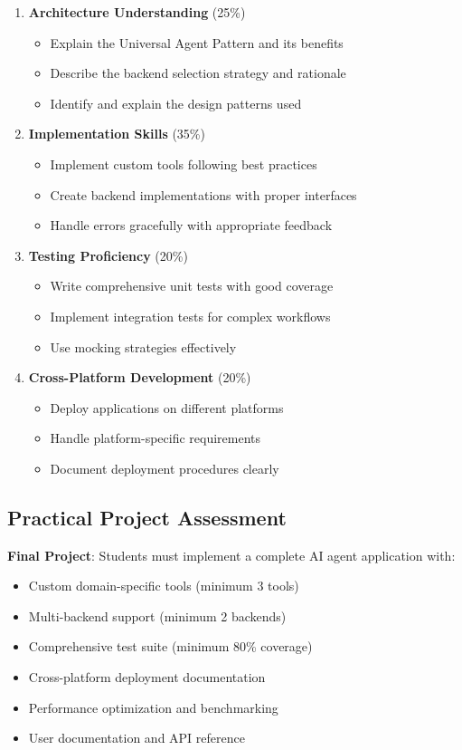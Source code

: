 \documentclass{article}
\begin{document}
\begin{enumerate}[label=\Alph*.]
    \item \textbf{Architecture Understanding} (25\%)
    \begin{itemize}
        \item Explain the Universal Agent Pattern and its benefits
        \item Describe the backend selection strategy and rationale
        \item Identify and explain the design patterns used
    \end{itemize}

    \item \textbf{Implementation Skills} (35\%)
    \begin{itemize}
        \item Implement custom tools following best practices
        \item Create backend implementations with proper interfaces
        \item Handle errors gracefully with appropriate feedback
    \end{itemize}

    \item \textbf{Testing Proficiency} (20\%)
    \begin{itemize}
        \item Write comprehensive unit tests with good coverage
        \item Implement integration tests for complex workflows
        \item Use mocking strategies effectively
    \end{itemize}

    \item \textbf{Cross-Platform Development} (20\%)
    \begin{itemize}
        \item Deploy applications on different platforms
        \item Handle platform-specific requirements
        \item Document deployment procedures clearly
    \end{itemize}
\end{enumerate}

\subsection{Practical Project Assessment}

\textbf{Final Project}: Students must implement a complete AI agent application with:
\begin{itemize}
    \item Custom domain-specific tools (minimum 3 tools)
    \item Multi-backend support (minimum 2 backends)
    \item Comprehensive test suite (minimum 80\% coverage)
    \item Cross-platform deployment documentation
    \item Performance optimization and benchmarking
    \item User documentation and API reference
\end{itemize}
\end{document}
